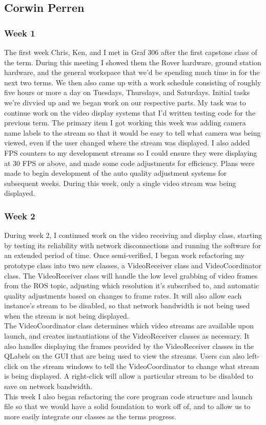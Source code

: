 \subsection{Corwin Perren}
\subsubsection{Week 1}
The first week Chris, Ken, and I met in Graf 306 after the first capstone class of the term. During this meeting I showed them the Rover hardware, ground station hardware, and the general workspace that we'd be spending much time in for the next two terms. We then also came up with a work schedule consisting of roughly five hours or more a day on Tuesdays, Thursdays, and Saturdays. Initial tasks we're divvied up and we began work on our respective parts. My task was to continue work on the video display systems that I'd written testing code for the previous term. The primary item I got working this week was adding camera name labels to the stream so that it would be easy to tell what camera was being viewed, even if the user changed where the stream was displayed. I also added FPS counters to my development streams so I could ensure they were displaying at 30 FPS or above, and made some code adjustments for efficiency. Plans were made to begin development of the auto quality adjustment systems for subsequent weeks. During this week, only a single video stream was being displayed.

\subsubsection{Week 2}
During week 2, I continued work on the video receiving and display class, starting by testing its reliability with network disconnections and running the software for an extended period of time. Once semi-verified, I began work refactoring my prototype class into two new classes, a VideoReceiver class and VideoCoordinator class. The VideoReceiver class will handle the low level grabbing of video frames from the ROS topic, adjusting which resolution it's subscribed to, and automatic quality adjustments based on changes to frame rates. It will also allow each instance's stream to be disabled, so that network bandwidth is not being used when the stream is not being displayed. 
\\
The VideoCoordinator class determines which video streams are available upon launch, and creates instantiations of the VideoReceiver classes as necessary. It also handles displaying the frames provided by the VideoReceiver classes in the QLabels on the GUI that are being used to view the streams. Users can also left-click on the stream windows to tell the VideoCoordinator to change what stream is being displayed. A right-click will allow a particular stream to be disabled to save on network bandwidth. 
\\
This week I also began refactoring the core program code structure and launch file so that we would have a solid foundation to work off of, and to allow us to more easily integrate our classes as the terms progress.

